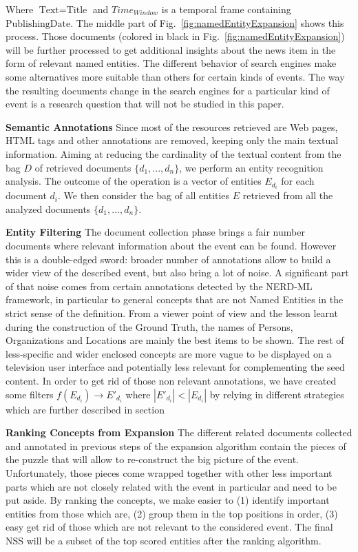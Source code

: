 \documentclass{llncs}
\begin{document}
Where $\text{Text}=\text{Title}$ and $Time_{Window}$ is a temporal frame containing $\text{PublishingDate}$. The middle part of Fig.~\ref{fig:namedEntityExpansion} shows this process. Those documents (colored in black in Fig.~\ref{fig:namedEntityExpansion}) will be further processed to get additional insights about the news item in the form of relevant named entities. The different behavior of search engines make some alternatives more suitable than others for certain kinds of events. The way the resulting documents change in the search engines for a particular kind of event is a research question that will not be studied in this paper. 

{\bf Semantic Annotations} Since most of the resources retrieved are Web pages, HTML tags and other annotations are removed, keeping only the main textual information. Aiming at reducing the cardinality of the textual content from the bag $D$ of retrieved documents $\{d_1, ..., d_n\}$, we perform an entity recognition analysis. The outcome of the operation is a vector of entities $E_{d_i}$ for each document $d_i$. We then consider the bag of all entities $E$ retrieved from all the analyzed documents $\{d_1, ..., d_n\}$. 

{\bf Entity Filtering} The document collection phase brings a fair number documents where relevant information about the event can be found. However this is a double-edged sword: broader number of annotations allow to build a wider view of the described event, but also bring a lot of noise. A significant part of that noise comes from certain annotations detected by the NERD-ML framework, in particular to general concepts that are not Named Entities in the strict sense of the definition. From a viewer point of view and the lesson learnt during the construction of the Ground Truth, the names of Persons, Organizations and Locations are mainly the best items to be shown. The rest of less-specific and wider enclosed concepts are more vague to be displayed on a television user interface and potentially less relevant for complementing the seed content. In order to get rid of those non relevant annotations, we have created some filters $f\left (  E_{d_i}\right )\rightarrow  E'_{d_i}$ where $\left |E'_{d_i}  \right | < \left |E_{d_i}  \right |$ by relying in different strategies which are further described in section 

{\bf Ranking Concepts from Expansion}
The different related documents collected and annotated in previous steps of the expansion algorithm contain the pieces of the puzzle that will allow to re-construct the big picture of the event. Unfortunately, those pieces come wrapped together with other less important parts which are not closely related with the event in particular and need to be put aside. By ranking the concepts, we make easier to (1) identify important entities from those which are, (2) group them in the top positions in order, (3) easy get rid of those which are not relevant to the considered event. The final NSS will be a subset of the top scored entities after the ranking algorithm.
\end{document}

